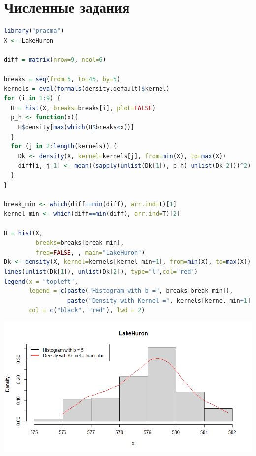 \documentclass[12pt]{extreport}
\theoremstyle{definiton}
\theoremstyle{definition}
\theoremstyle{definition}
\newcounter{problem}
\renewcommand{\theproblem}{\arabic{problem}}
\newcommand{\problemname}{\color{blue} Задача}
\newenvironment{problem}[1]{
	\addtocounter{problem}{1}\noindent{\large\bfseries \problemname{} \theproblem \,.
		}
}{
	\par\bigskip
}
\begin{document}
\section*{Численные задания}
\begin{problem}{5}
\begin{lstlisting}[language=R]
library("pracma")
X <- LakeHuron

diff = matrix(nrow=9, ncol=6)

breaks = seq(from=5, to=45, by=5)
kernels = eval(formals(density.default)$kernel)
for (i in 1:9) {
  H = hist(X, breaks=breaks[i], plot=FALSE)
  p_h <- function(x){
    H$density[max(which(H$breaks<x))]
  }
  for (j in 2:length(kernels)) {
    Dk <- density(X, kernel=kernels[j], from=min(X), to=max(X))
    diff[i, j-1] <- mean((sapply(unlist(Dk[1]), p_h)-unlist(Dk[2]))^2)
  }
}

break_min <- which(diff==min(diff), arr.ind=T)[1]
kernel_min <- which(diff==min(diff), arr.ind=T)[2]

H = hist(X,
         breaks=breaks[break_min],
         freq=FALSE, , main="LakeHuron")
Dk <- density(X, kernel=kernels[kernel_min+1], from=min(X), to=max(X))
lines(unlist(Dk[1]), unlist(Dk[2]), type="l",col="red")
legend(x = "topleft",
       legend = c(paste("Histogram with b =", breaks[break_min]),
                  paste("Density with Kernel =", kernels[kernel_min+1])),
       col = c("black", "red"), lwd = 2)
\end{lstlisting}
\includegraphics[scale=0.6]{T2_1.png}
\end{problem}
\end{document}
